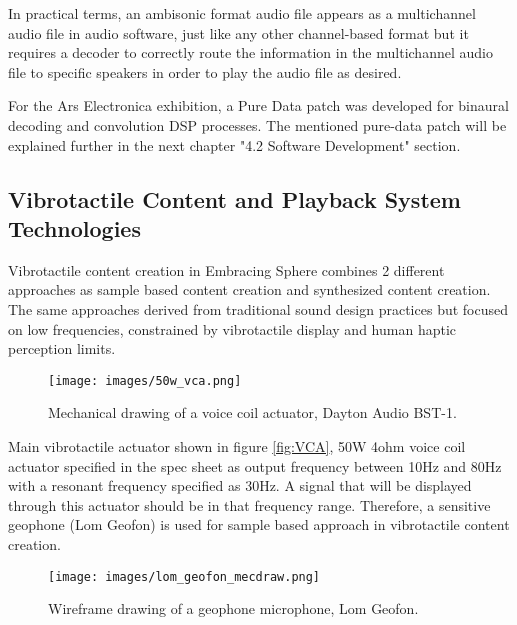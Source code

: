             In practical terms, an ambisonic format audio file appears as a multichannel audio file in audio software, just like any other channel-based format but it requires a decoder to correctly route the information in the multichannel audio file to specific speakers in order to play the audio file as desired.\par

            For the Ars Electronica exhibition, a Pure Data patch was developed for binaural decoding and convolution DSP processes. The mentioned pure-data patch will be explained further in the next chapter "4.2 Software Development" section.\par
        \subsection{Vibrotactile Content and Playback System Technologies}
            Vibrotactile content creation in Embracing Sphere combines 2 different approaches as sample based content creation and synthesized content creation. The same approaches derived from traditional sound design practices but focused on low frequencies, constrained by vibrotactile display and human haptic perception limits.\par

            \begin{figure}[H]
                \centering
                \texttt{[image: images/50w\_vca.png]}
                \caption{Mechanical drawing of a voice coil actuator, Dayton Audio BST-1.}
                \label{fig:VCA_MECDRAW}
            \end{figure}

            Main vibrotactile actuator shown in figure \ref{fig:VCA}, 50W 4ohm voice coil actuator specified in the spec sheet as output frequency between 10Hz and 80Hz with a resonant frequency specified as 30Hz. A signal that will be displayed through this actuator should be in that frequency range. Therefore, a sensitive geophone (Lom Geofon) is used for sample based approach in vibrotactile content creation.\par

            \begin{figure}[H]
                \centering
                \texttt{[image: images/lom\_geofon\_mecdraw.png]}
                \caption{Wireframe drawing of a geophone microphone, Lom Geofon.}
                \label{fig:WF_GEOFON}
            \end{figure}

